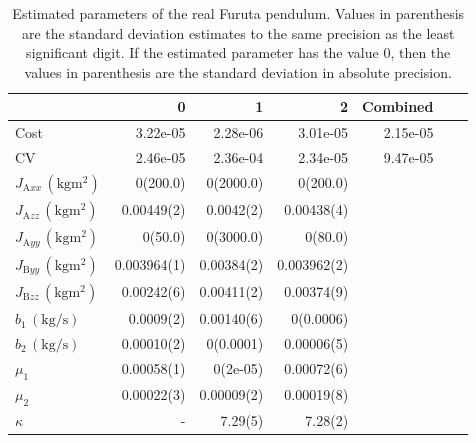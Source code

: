 \documentclass[preprint,12pt]{elsarticle}
\numberwithin{equation}{section}
\def\tA{\text{A}}
\def\tB{\text{B}}
\begin{document}
\begin{table}
\caption{
Estimated parameters of the real Furuta pendulum.
Values in parenthesis are the standard deviation estimates to the same precision as the least significant digit.
If the estimated parameter has the value $0$, then the values in parenthesis are the standard deviation in absolute precision.
}
\centering
\label{tab:furuta_baseline_mix}
\begin{tabular}{l|rrrrr|r}
\toprule
{} & {0} & {1} & {2} & {Combined} \\
\midrule
Cost & 3.22e-05 & 2.28e-06 & 3.01e-05 & 2.15e-05 \\
CV & 2.46e-05 & 2.36e-04 & 2.34e-05 & 9.47e-05 \\
$J_{\tA xx}\,(\si{\kilogram\meter^2})$ & 0(200.0) & 0(2000.0) & 0(200.0) &  \\
$J_{\tA zz}\,(\si{\kilogram\meter^2})$ & 0.00449(2) & 0.0042(2) & 0.00438(4) &  \\
$J_{\tA yy}\,(\si{\kilogram\meter^2})$ & 0(50.0) & 0(3000.0) & 0(80.0) &  \\
$J_{\tB yy}\,(\si{\kilogram\meter^2})$ & 0.003964(1) & 0.00384(2) & 0.003962(2) & \\
$J_{\tB zz}\,(\si{\kilogram\meter^2})$ & 0.00242(6) & 0.00411(2) & 0.00374(9) &  \\
$b_1\,(\si{\kilogram\per\second})$ & 0.0009(2) & 0.00140(6) & 0(0.0006) &  \\
$b_2\,(\si{\kilogram\per\second})$ & 0.00010(2) & 0(0.0001) & 0.00006(5) &  \\
$\mu_1$ & 0.00058(1) & 0(2e-05) & 0.00072(6) &  \\
$\mu_2$ & 0.00022(3) & 0.00009(2) & 0.00019(8) &  \\
$\kappa$ & - & 7.29(5) & 7.28(2) &  \\
\bottomrule
\end{tabular}
\end{table}
\end{document}
